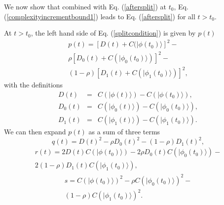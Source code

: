 \documentclass[12pt,amsmath,amssymb,onecolumn]{revtex4-2}
\begin{document}
We now show that combined with Eq. (\ref{aftersplit}) at
$t_0$, Eq. (\ref{complexityincrementbound1}) leads
to Eq. (\ref{aftersplit}) for all $t > t_0$.

At  $t > t_0$, the left hand side of Eq. (\ref{splitcondition}) is given
by $p(t)$
\begin{multline}
  \label{lefthand}
  p(t) = [ D( t) + C(|\phi( t_0) \rangle ] ^2 - \\
  \rho [D_0( t) + C( |\phi_0(t_0) \rangle )]^2 - \\
  (1-\rho) [D_1( t) + C( |\phi_1(t_0) \rangle )]^2,
\end{multline}
with the definitions
\begin{subequations}
  \begin{eqnarray}
    \label{defD}
    D(t) & = &  C( |\phi(t) \rangle ) - C(|\phi(t_0) \rangle ) ,\\
 \label{defD0}
    D_0(t) & = &  C( |\phi_0(t) \rangle ) - C(|\phi_0(t_0) \rangle ) ,\\
 \label{defD1}
    D_1(t) & = &  C( |\phi_1(t) \rangle ) - C(|\phi_1(t_0) \rangle ).
  \end{eqnarray}
\end{subequations}
We can then expand $p(t)$ as a sum of three terms
\begin{equation}
  \label{alpha}
  q( t) = D(t)^2 - \rho D_0(t)^2 - (1 - \rho) D_1(t)^2,
\end{equation}
\begin{multline}
  \label{beta}
  r( t) = 2 D(t)C(|\phi(t_0) \rangle ) - 2\rho D_0(t)C(|\phi_0(t_0) \rangle ) - \\2 (1 - \rho) D_1(t)C(|\phi_1(t_0) \rangle ),
\end{multline}
\begin{multline}
  \label{gamma}
  s = C(|\phi(t_0) \rangle )^2 - \rho C(|\phi_0(t_0) \rangle )^2 - \\(1 - \rho)C(|\phi_1(t_0) \rangle )^2.
\end{multline}
\end{document}
